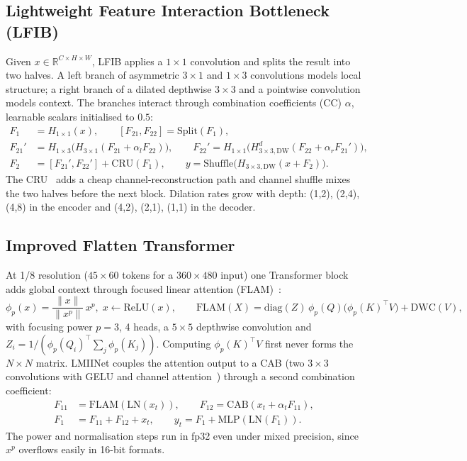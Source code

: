 \documentclass{article}
\begin{document}
\subsection{Lightweight Feature Interaction Bottleneck (LFIB)}
\label{sec:lfib}
Given $x\in\mathbb{R}^{C\times H\times W}$, LFIB applies a $1{\times}1$ convolution and splits the
result into two halves. A left branch of asymmetric $3{\times}1$ and $1{\times}3$ convolutions models
local structure; a right branch of a dilated depthwise $3{\times}3$ and a pointwise convolution
models context. The branches interact through combination coefficients (CC) $\alpha$, learnable
scalars initialised to $0.5$:
\begin{align}
F_1 &= H_{1\times1}(x), \qquad [F_{21}, F_{22}] = \mathrm{Split}(F_1),\\
F_{21}' &= H_{1\times3}\big(H_{3\times1}(F_{21} + \alpha_l F_{22})\big),\qquad
F_{22}' = H_{1\times1}\big(H^{d}_{3\times3,\mathrm{DW}}(F_{22} + \alpha_r F_{21}')\big),\\
F_2 &= [F_{21}', F_{22}'] + \mathrm{CRU}(F_1), \qquad
y = \mathrm{Shuffle}\big(H_{3\times3,\mathrm{DW}}(x + F_2)\big).
\end{align}
The CRU~\cite{li2023scconv} adds a cheap channel-reconstruction path and channel shuffle mixes the
two halves before the next block. Dilation rates grow with depth: (1,2), (2,4), (4,8) in the
encoder and (4,2), (2,1), (1,1) in the decoder.

\subsection{Improved Flatten Transformer}
At 1/8 resolution ($45{\times}60$ tokens for a $360{\times}480$ input) one Transformer block adds
global context through focused linear attention (FLAM)~\cite{han2023flatten}:
\begin{equation}
\phi_p(x) = \frac{\lVert x\rVert}{\lVert x^{p}\rVert}\,x^{p},\; x\leftarrow\mathrm{ReLU}(x),\qquad
\mathrm{FLAM}(X) = \mathrm{diag}(Z)\,\phi_p(Q)\big(\phi_p(K)^\top V\big) + \mathrm{DWC}(V),
\end{equation}
with focusing power $p=3$, 4 heads, a $5{\times}5$ depthwise convolution and
$Z_i = 1/(\phi_p(Q_i)^\top \sum_j \phi_p(K_j))$. Computing $\phi_p(K)^\top V$ first never forms the
$N{\times}N$ matrix. LMIINet couples the attention output to a CAB (two $3{\times}3$ convolutions
with GELU and channel attention~\cite{chen2023hat}) through a second combination coefficient:
\begin{align}
F_{11} &= \mathrm{FLAM}(\mathrm{LN}(x_t)),\qquad F_{12} = \mathrm{CAB}(x_t + \alpha_t F_{11}),\\
F_1 &= F_{11} + F_{12} + x_t, \qquad y_t = F_1 + \mathrm{MLP}(\mathrm{LN}(F_1)).
\end{align}
The power and normalisation steps run in fp32 even under mixed precision, since $x^{p}$ overflows
easily in 16-bit formats.
\end{document}
